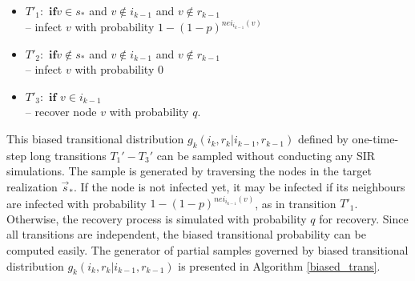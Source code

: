 \documentclass[times, utf8, diplomski]{fer}
\newcommand\tab[1][1cm]{\hspace*{#1}}
\begin{document}
\begin{itemize}
\item{$T'_1:$ $\mathbf{if} v \in s_*$ and $v \not\in i_{k - 1}$ and $v \not\in r_{k - 1}$\\  %
 \tab -- infect $v$ with probability $1 - (1 - p) ^ {nei_{i_{k-1}}(v)}$} 
\item{$T'_2:$ $\mathbf{if} v \not\in s_*$ and $v \not\in i_{k - 1}$ and $v \not\in r_{k - 1}$%
\\\tab -- infect $v$ with probability $0$}
\item{$T'_3:$ $\mathbf{if}$ $v \in i_{k - 1}$ \\ \tab -- recover node $v$  with probability $q$.}
\end{itemize}

This biased transitional distribution $g_k(i_k, r_k | i_{k - 1}, r_{k - 1})$ defined by one-time-step long transitions $T_1' - T_3'$ can be sampled without conducting any SIR simulations. The sample is generated by traversing the nodes in the target realization $\vec s_*$. If the node is not infected yet, it may be infected if its neighbours are infected with probability  $1 - (1 - p)^{nei_{i_{k - 1}}(v)}$, as in transition $T'_1$.  Otherwise, the recovery process is simulated with probability $q$ for recovery. Since all  transitions are independent, the biased transitional probability can be computed easily. The generator of partial samples governed by  biased transitional distribution $g_k(i_k, r_k | i_{k - 1}, r_{k - 1})$ is presented in Algorithm \ref{biased_trans}. 
 
\end{document}
